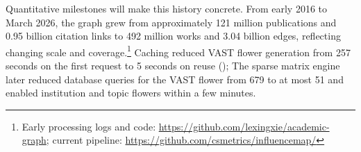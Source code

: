 \documentclass[]{hdsr}
\begin{document}

Quantitative milestones will make this history concrete. From early 2016 to March 2026, the graph grew from approximately 121 million publications and 0.95 billion citation links to 492 million works and 3.04 billion edges, reflecting changing scale and coverage.\footnote{Early processing logs and code: \url{https://github.com/lexingxie/academic-graph}; current pipeline: \url{https://github.com/csmetrics/influencemap/}} Caching reduced VAST flower generation from 257 seconds on the first request to 5 seconds on reuse (\cite{shin2019influence}); The sparse matrix engine later reduced database queries for the VAST flower from 679 to at most 51 and enabled institution and topic flowers within a few minutes.


\end{document}
